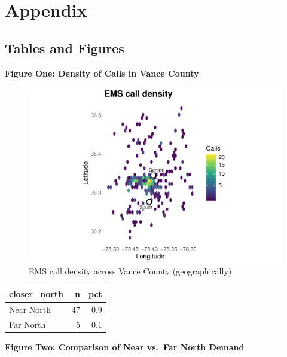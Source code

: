 \documentclass[
]{article}
\begin{document}
\section{Appendix}\label{appendix}

\subsection{Tables and Figures}\label{tables-and-figures}

\textbf{Figure One: Density of Calls in Vance County}

\begin{figure}
\centering
\includegraphics{Report_files/figure-latex/eda1-1.pdf}
\caption{EMS call density across Vance County (geographically)}
\end{figure}

\newpage

\begin{longtable}[]{@{}lrr@{}}
\toprule\noalign{}
closer\_north & n & pct \\
\midrule\noalign{}
\endhead
\bottomrule\noalign{}
\endlastfoot
Near North & 47 & 0.9 \\
Far North & 5 & 0.1 \\
\end{longtable}

\textbf{Figure Two: Comparison of Near vs.~Far North Demand}
\end{document}
